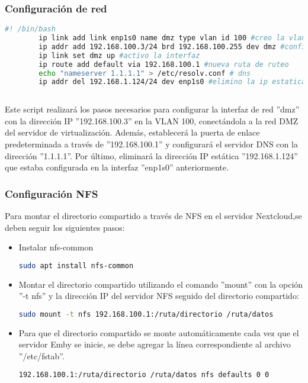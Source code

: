 		\subsubsection{Configuración de red}
	
			\begin{lstlisting}[language=Bash, caption=docker]
		#! /bin/bash
		ip link add link enp1s0 name dmz type vlan id 100 #creo la vlan
		ip addr add 192.168.100.3/24 brd 192.168.100.255 dev dmz #configuro la ip
		ip link set dmz up #activo la interfaz
		ip route add default via 192.168.100.1 #nueva ruta de ruteo
		echo "nameserver 1.1.1.1" > /etc/resolv.conf # dns
		ip addr del 192.168.1.124/24 dev enp1s0 #elimino la ip estatica anterio
		
			\end{lstlisting}

			Este script realizará los pasos necesarios para configurar la interfaz de red ''dmz'' con la dirección IP ''192.168.100.3'' en la VLAN 100, conectándola a la red DMZ del servidor de virtualización. Además, establecerá la puerta de enlace predeterminada a través de ''192.168.100.1'' y configurará el servidor DNS con la dirección ''1.1.1.1''. Por último, eliminará la dirección IP estática ''192.168.1.124'' que estaba configurada en la interfaz ''enp1s0'' anteriormente.
			
			\subsubsection{Configuración NFS}
			Para montar el directorio compartido a través de NFS en el servidor Nextcloud,se deben seguir los siguientes pasos:
			
			\begin{itemize}
				\item Instalar nfs-common
				\begin{lstlisting}[language=Bash, caption=nfs-common]
					sudo apt install nfs-common
				\end{lstlisting}
				
				\item Montar el directorio compartido utilizando el comando ''mount'' con la opción ''-t nfs'' y la dirección IP del servidor NFS seguido del directorio compartido:
				\begin{lstlisting}[language=Bash, caption=mount]
					sudo mount -t nfs 192.168.100.1:/ruta/directorio /ruta/datos
				\end{lstlisting}
				
				\item Para que el directorio compartido se monte automáticamente cada vez que el servidor Emby se inicie, se debe agregar la línea correspondiente al archivo ''/etc/fstab''.
				\begin{lstlisting}[language=Bash, caption=fstab]
					192.168.100.1:/ruta/directorio /ruta/datos nfs defaults 0 0
				\end{lstlisting}	
			\end{itemize}
		
